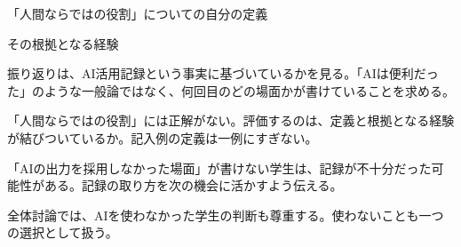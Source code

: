 \begin{achecks}
  \item 「人間ならではの役割」についての自分の定義
  \item その根拠となる経験
\end{achecks}

\begin{point}
  \item 振り返りは、AI活用記録という事実に基づいているかを見る。「AIは便利だった」のような一般論ではなく、何回目のどの場面かが書けていることを求める。
  \item 「人間ならではの役割」には正解がない。評価するのは、定義と根拠となる経験が結びついているか。記入例の定義は一例にすぎない。
  \item 「AIの出力を採用しなかった場面」が書けない学生は、記録が不十分だった可能性がある。記録の取り方を次の機会に活かすよう伝える。
  \item 全体討論では、AIを使わなかった学生の判断も尊重する。使わないことも一つの選択として扱う。
\end{point}
